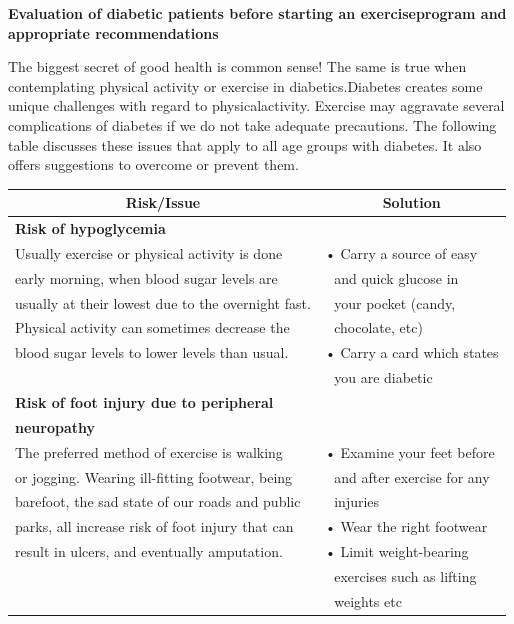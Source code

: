 \vskip 4pt
\noindent\textbf{Evaluation of diabetic patients before starting an exercise\break program and appropriate recommendations}
\vskip 4pt

The biggest secret of good health is common sense! The same is true when contemplating physical activity or exercise in diabetics.\break Diabetes creates some unique challenges with regard to physical\break activity. Exercise may aggravate several complications of diabetes if we do not take adequate precautions. The following table discusses these issues that apply to all age groups with diabetes. It also offers suggestions to overcome or prevent them.

\vskip 4pt

{
\small\addtolength{\tabcolsep}{-5pt}
\begin{longtable}{|l|l|}
\hline
\multicolumn{1}{|c|}{\textbf{Risk/Issue}} & \multicolumn{1}{|c|}{\textbf{Solution}}\\
\hline
\textbf{Risk of hypoglycemia\index{Hypoglycemia}} & \\
Usually exercise or physical activity is done & • Carry a source of easy\\
early morning, when blood sugar levels are & \,\, and quick glucose in\\
usually at their lowest due to the overnight fast. & \,\, your pocket (candy,\\
Physical activity can sometimes decrease the & \,\, chocolate, etc)\\
\hline
blood sugar levels to lower levels than usual. & • Carry a card which states\\
 & \,\, you are diabetic\\
\hline
\textbf{Risk of foot injury due to peripheral} & \\
\textbf{neuropathy\index{Peripheral neuropathy}} & \\
The preferred method of exercise is walking & • Examine your feet before\\
or jogging. Wearing ill-fitting footwear, being & \,\, and after exercise for any\\
barefoot, the sad state of our roads and public & \,\, injuries\\
parks, all increase risk of foot injury that can & • Wear the right footwear\\
result in ulcers, and eventually amputation. & • Limit weight-bearing\\
 & \,\, exercises such as lifting\\
 &\,\, weights etc\\

\end{longtable}}
